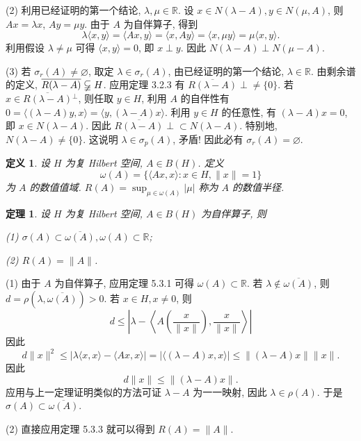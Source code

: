 \documentclass[openany]{ctexbook}
\makeatletter
\theoremstyle{kaiti}
\newtheorem{definition}{定义}[section]
\newtheorem{theorem}{定理}[section]
\theoremstyle{normal}
\renewenvironment{proof}[1][\proofname]{\par
    \pushQED{\qed}%
    \normalfont \topsep6\p@\@plus6\p@\relax
    \trivlist
    \item\relax
    {\heiti #1}\hspace{2\labelsep}\ignorespaces
  }{%
    \popQED\endtrivlist\@endpefalse
  }
\makeatother
\begin{document}
\begin{proof}
(2) 利用已经证明的第一个结论, $\lambda, \mu \in \mathbb{R}$. 设 $x \in N(\lambda-A), y \in N(\mu, A)$, 则 $A x=\lambda x$,
$A y=\mu y$. 由于 $A$ 为自伴算子, 得到
$$
\lambda\langle x, y\rangle=\langle A x, y\rangle=\langle x, A y\rangle=\langle x, \mu y\rangle=\mu\langle x, y\rangle.
$$
利用假设 $\lambda \neq \mu$ 可得 $\langle x, y\rangle=0$, 即 $x \perp y$. 因此 $N(\lambda-A) \perp N(\mu-A)$.

(3) 若 $\sigma_{r}(A) \neq \varnothing$, 取定 $\lambda \in \sigma_{r}(A)$, 由已经证明的第一个结论, $\lambda \in \mathbb{R}$. 由剩余谱的定义, $\overline{R(\lambda-A)} \varsubsetneqq H$. 应用定理 3.2.3 有 $\overline{R(\lambda-A)} \perp \neq\{0\}$. 若 $x \in \overline{R(\lambda-A)}{ }^{\perp}$, 则任取 $y \in H$, 利用 $A$ 的自伴性有 $0=\langle(\lambda-A) y, x\rangle=\langle y,(\lambda-A) x\rangle$. 利用 $y \in H$ 的任意性, 有 $(\lambda-A) x=0$, 即 $x \in N(\lambda-A)$. 因此 $\overline{R(\lambda-A)} \perp \subset N(\lambda-A)$. 特别地, $N(\lambda-A) \neq\{0\}$. 这说明 $\lambda \in \sigma_{p}(A)$, 矛盾! 因此必有 $\sigma_{r}(A)=\varnothing$.
\end{proof}

\begin{definition}
设 $H$ 为复 Hilbert 空间, $A \in B(H)$. 定义
$$
\omega(A)=\{\langle A x, x\rangle: x \in H,\|x\|=1\}
$$
为 $A$ 的数值值域. $R(A)=\sup_{\mu \in \omega(A)}|\mu|$ 称为 $A$ 的数值半径.
\end{definition}

\begin{theorem}
设 $H$ 为复 Hilbert 空间, $A \in B(H)$ 为自伴算子, 则

(1) $\sigma(A) \subset \overline{\omega(A)}, \omega(A) \subset \mathbb{R}$;

(2) $R(A)=\|A\|$.
\end{theorem}

\begin{proof}
(1) 由于 $A$ 为自伴算子, 应用定理 5.3.1 可得 $\omega(A) \subset \mathbb{R}$.
若 $\lambda \notin \overline{\omega(A)}$, 则 $d=\rho(\lambda, \overline{\omega(A)})>0$. 若 $x \in H, x \neq 0$, 则
$$
d \leqslant\left|\lambda-\left\langle A\left(\frac{x}{\|x\|}\right), \frac{x}{\|x\|}\right\rangle\right|
$$
因此
$$
d\|x\|^2 \leqslant|\lambda\langle x, x\rangle-\langle A x, x\rangle|=|\langle(\lambda-A) x, x\rangle| \leqslant\|(\lambda-A) x\|\|x\|.
$$
因此
$$
d\|x\| \leqslant\|(\lambda-A) x\|.
$$
应用与上一定理证明类似的方法可证 $\lambda-A$ 为一一映射, 因此 $\lambda \in \rho(A)$. 于是 $\sigma(A) \subset \overline{\omega(A)}$.

(2) 直接应用定理 5.3.3 就可以得到 $R(A)=\|A\|$.
\end{proof}
\end{document}
